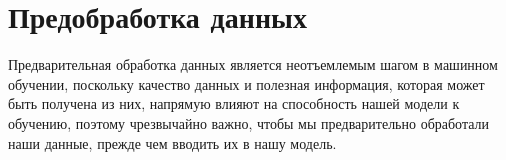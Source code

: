 \chapter{Предобработка данных}

Предварительная обработка данных является неотъемлемым шагом в машинном обучении, поскольку качество данных и полезная информация, которая может быть получена из них, напрямую влияют на способность нашей модели к обучению, поэтому чрезвычайно важно, чтобы мы предварительно обработали наши данные, прежде чем вводить их в нашу модель.






% 
%
%
%
%
%
%

